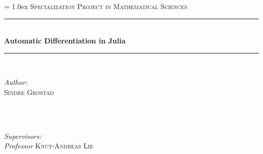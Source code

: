 \begin{titlepage}

\newcommand{\HRule}{\rule{\linewidth}{0.5mm}} %

\center %
 

\parindent=0.0cm
\parskip = 1.0ex
\vspace*{1.5cm}
\textsc{\Large Specialization Project in Mathematical Sciences}\\[0.5cm] %


\HRule \\[0.7cm]
{ \huge \bfseries Automatic Differentiation in Julia}\\[0.4cm] %
\HRule \\[1.5cm]
 

\begin{minipage}{0.4\textwidth}
\begin{flushleft} \large
\emph{Author:} \\ 
\textsc{Sindre Grøstad} \\ %
\textsc{ } \\
\end{flushleft}
\end{minipage}
~
\begin{minipage}{0.5\textwidth}
\begin{flushright} \large
\emph{Supervisors:} \\
\emph{Professor} \textsc{Knut-Andreas Lie} \\%
\end{flushright}
\end{minipage}\\[4cm]
\vspace{5cm}


\end{titlepage}
